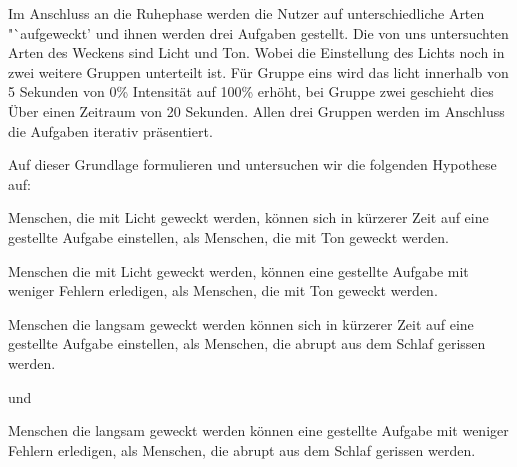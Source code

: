 Im Anschluss an die Ruhephase werden die Nutzer auf unterschiedliche Arten "`aufgeweckt' und ihnen werden drei Aufgaben gestellt. Die von uns untersuchten Arten des Weckens sind Licht und Ton. Wobei die Einstellung des Lichts noch in zwei weitere Gruppen unterteilt ist. Für Gruppe eins wird das licht innerhalb von 5 Sekunden von 0\% Intensität auf 100\% erhöht, bei Gruppe zwei geschieht dies Über einen Zeitraum von 20 Sekunden. 
Allen drei Gruppen werden im Anschluss die Aufgaben iterativ präsentiert.

Auf dieser Grundlage formulieren und untersuchen wir die folgenden Hypothese auf:

\begin{hyp}\label{hyp:lichtSchneller}
	Menschen, die mit Licht geweckt werden, können sich in kürzerer Zeit auf eine gestellte Aufgabe einstellen, als Menschen, die mit Ton geweckt werden.
\end{hyp}

\begin{hyp}\label{hyp:lichtErfolgreicher}
	Menschen die mit Licht geweckt werden, können eine gestellte Aufgabe mit weniger Fehlern erledigen, als Menschen, die mit Ton geweckt werden.
\end{hyp}

\begin{hyp}\label{hyp:langKurzSchneller}
	Menschen die langsam geweckt werden können sich in kürzerer Zeit auf eine gestellte Aufgabe einstellen, als Menschen, die abrupt aus dem Schlaf gerissen werden.
\end{hyp}

und 

\begin{hyp}\label{hyp:langKurzErfolgreicher}
	Menschen die langsam geweckt werden können eine gestellte Aufgabe mit weniger Fehlern erledigen, als Menschen, die abrupt aus dem Schlaf gerissen werden.
\end{hyp}

